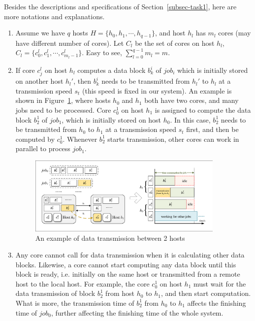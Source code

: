 \documentclass{llncs}
\begin{document}
	Besides the descriptions and specifications of Section~\ref{subsec-task1}, here are more notations and explanations.
	
	\begin{enumerate}
		
		\item Assume we have $q$ hosts $H=\{h_0, h_1, \cdots, h_{q-1}\}$, and host $h_l$ has $m_l$ cores (may have different number of cores). Let $C_l$ be the set of cores on host $h_l$, $C_l = \{c^l_0, c^l_1, \cdots, c^l_{m_l-1}\}$. Easy to see, $\sum_{l=0}^{q-1} m_l = m$.
		
		\vspace{2mm}
		
		\item If core $c^l_j$ on host $h_l$ computes a data block $b^i_{k}$ of $job_i$ which is initially stored on another host $h_l'$, then $b^i_{k}$ needs to be transmitted from $h_l'$ to $h_l$ at a transmission speed $s_t$ (this speed is fixed in our system). An example is shown in Figure~\ref{Fig-Transmission}, where hosts $h_0$ and $h_1$ both have two cores, and many jobs need to be processed. Core $c^1_0$ on host $h_1$ is assigned to compute the data block $b^1_2$ of $job_1$, which is initially stored on host $h_0$. In this case, $b^1_2$ needs to be transmitted from $h_0$ to $h_1$ at a transmission speed $s_t$ first, and then be computed by $c^1_0$. Whenever $b^1_2$ starts transmission, other cores can work in parallel to process $job_1$.
		
		\begin{figure}[H]
			\begin{center}
				\includegraphics[width=0.9\textwidth]{Fig-Transmission.pdf}
				\caption{An example of data transmission between 2 hosts}
				\label{Fig-Transmission}
			\end{center}
		\end{figure}
		
		\item Any core cannot call for data transmission when it is calculating other data blocks. Likewise, a core cannot start computing any data block until this block is ready, i.e. initially on the same host or transmitted from a remote host to the local host. For example, the core $c^1_0$ on host $h_1$ must wait for the data transmission of block $b^1_2$ from host $h_0$ to $h_1$, and then start computation. What is more, the transmission time of $b^1_2$ from $h_0$ to $h_1$ affects the finishing time of $job_0$, further affecting the finishing time of the whole system. 
		

\end{enumerate}
\end{document}
